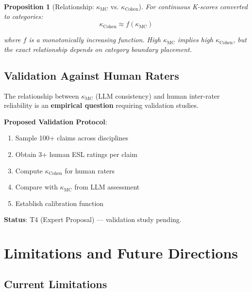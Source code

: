 \documentclass[11pt,a4paper]{article}
\newtheorem{proposition}[theorem]{Proposition}
\theoremstyle{remark}
\begin{document}
\begin{proposition}[Relationship: $\kappa_{\text{MC}}$ vs. $\kappa_{\text{Cohen}}$]
\label{prop:kappa-relation}
For continuous K-scores converted to categories:
\begin{equation}
\kappa_{\text{Cohen}} \approx f(\kappa_{\text{MC}})
\end{equation}

where $f$ is a monotonically increasing function. High $\kappa_{\text{MC}}$ implies high $\kappa_{\text{Cohen}}$, but the exact relationship depends on category boundary placement.
\end{proposition}

\subsection{Validation Against Human Raters}

\begin{warningbox}
The relationship between $\kappa_{\text{MC}}$ (LLM consistency) and human inter-rater reliability is an \textbf{empirical question} requiring validation studies.

\textbf{Proposed Validation Protocol}:
\begin{enumerate}
    \item Sample 100+ claims across disciplines
    \item Obtain 3+ human ESL ratings per claim
    \item Compute $\kappa_{\text{Cohen}}$ for human raters
    \item Compare with $\kappa_{\text{MC}}$ from LLM assessment
    \item Establish calibration function
\end{enumerate}

\textbf{Status}: T4 (Expert Proposal) --- validation study pending.
\end{warningbox}


\section{Limitations and Future Directions}
\label{sec:limitations}

\subsection{Current Limitations}
\end{document}
